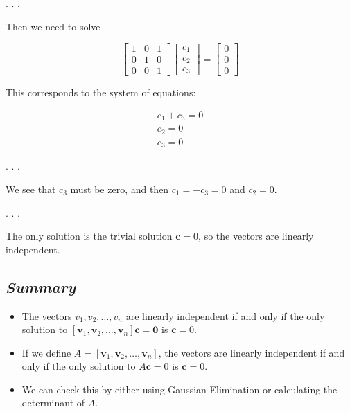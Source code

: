 \documentclass[
  letterpaper,
  DIV=11,
  numbers=noendperiod]{scrartcl}
\providecommand{\tightlist}{%
  \setlength{\itemsep}{0pt}\setlength{\parskip}{0pt}}\usepackage{longtable,booktabs,array}
\begin{document}
. . .

Then we need to solve

\[
\left[\begin{array}{ccc}
1 & 0 & 1 \\
0 & 1 & 0 \\
0 & 0 & 1
\end{array}\right]
\left[\begin{array}{c}
c_1 \\ c_2 \\ c_3
\end{array}\right]
= \left[\begin{array}{c}
0 \\ 0 \\ 0
\end{array}\right]
\]

This corresponds to the system of equations:

\[
\begin{gather}
c_1 + c_3 = 0 \\
c_2 = 0 \\
c_3 = 0
\end{gather}
\]

. . .

We see that \(c_3\) must be zero, and then \(c_1 = -c_3 = 0\) and
\(c_2 = 0\).

. . .

The only solution is the trivial solution \(\mathbf{c}=0\), so the
vectors are linearly independent.

\subsection{\texorpdfstring{\emph{Summary}}{Summary}}\label{summary}

\begin{itemize}
\tightlist
\item
  The vectors \(v_1, v_2, \ldots, v_n\) are linearly independent if and
  only if the only solution to
  \([\mathbf{v}_1, \mathbf{v}_2, \ldots, \mathbf{v}_n] \mathbf{c}=\mathbf{0}\)
  is \(\mathbf{c}=0\).
\item
  If we define \(A=[\mathbf{v}_1, \mathbf{v}_2, \ldots, \mathbf{v}_n]\),
  the vectors are linearly independent if and only if the only solution
  to \(A \mathbf{c}=0\) is \(\mathbf{c}=0\).
\item
  We can check this by either using Gaussian Elimination or calculating
  the determinant of \(A\).
\end{itemize}
\end{document}
